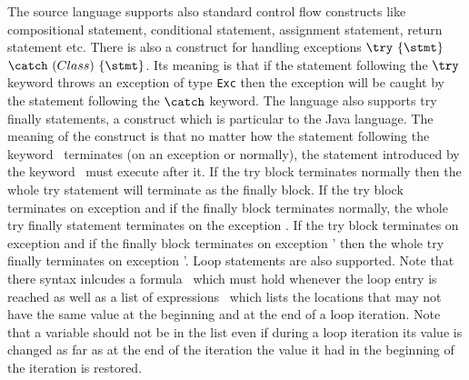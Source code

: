     The source language supports also standard control flow constructs like 
    compositional statement, conditional statement, assignment statement, return statement etc.
  There is also a construct for handling exceptions $ \try  \ \{ \stmt \} $ $ \catch \ ( Class  )\ \{ \stmt \}  $.
  Its meaning is that if the statement following the $ \try $ keyword throws an exception of type \texttt{Exc} then
  the exception will be caught by the statement following the  $ \catch $ keyword. The language also supports 
  try finally statements, a construct which is particular to the Java language.
  The meaning of the construct is that  no matter how the statement following the keyword \try \ terminates (on an exception or normally),
  the statement introduced by the keyword \finally \ must execute after it. If the try block terminates normally then the
  whole try statement will terminate as the finally block. If the try block terminates on exception \Exc{} and if the finally block
  terminates normally, the whole try finally statement terminates  on the exception  \Exc{}.  If the try block terminates on exception \Exc{} and if the finally block
  terminates on exception \Exc' then the whole try finally  terminates on exception \Exc'.
  Loop statements are also supported.  Note that there syntax inlcudes  a formula \invariant \ which must hold whenever 
  the loop entry is reached as well as a  list of expressions
  \modLoop \ which lists the locations that  may not have the same value at the beginning
  and at the end of a loop iteration. Note that a  variable should not be in the list \modLoop{} even if during a loop iteration its value is changed
  as far as at the end of the iteration the value it had in the beginning of the iteration is restored.

